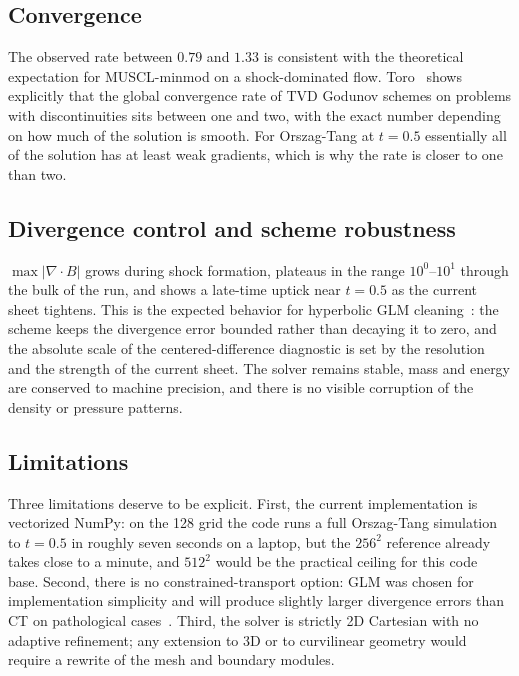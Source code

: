 \documentclass[11pt]{article}
\begin{document}
\subsection{Convergence}

The observed rate between $0.79$ and $1.33$ is consistent with the theoretical expectation for MUSCL-minmod on a shock-dominated flow. Toro~\cite{toro2009} shows explicitly that the global convergence rate of TVD Godunov schemes on problems with discontinuities sits between one and two, with the exact number depending on how much of the solution is smooth.  For Orszag-Tang at $t=0.5$ essentially all of the solution has at least weak gradients, which is why the rate is closer to one than two.

\subsection{Divergence control and scheme robustness}

$\max|\nabla\cdot B|$ grows during shock formation, plateaus in the range $10^{0}$--$10^{1}$ through the bulk of the run, and shows a late-time uptick near $t = 0.5$ as the current sheet tightens.  This is the expected behavior for hyperbolic GLM cleaning~\cite{dedner2002}: the scheme keeps the divergence error bounded rather than decaying it to zero, and the absolute scale of the centered-difference diagnostic is set by the resolution and the strength of the current sheet.  The solver remains stable, mass and energy are conserved to machine precision, and there is no visible corruption of the density or pressure patterns.

\subsection{Limitations}

Three limitations deserve to be explicit.  First, the current implementation is vectorized NumPy: on the 128 grid the code runs a full Orszag-Tang simulation to $t = 0.5$ in roughly seven seconds on a laptop, but the $256^{2}$ reference already takes close to a minute, and $512^{2}$ would be the practical ceiling for this code base.  Second, there is no constrained-transport option: GLM was chosen for implementation simplicity and will produce slightly larger divergence errors than CT on pathological cases~\cite{balsara1999,londrillo2000}.  Third, the solver is strictly 2D Cartesian with no adaptive refinement; any extension to 3D or to curvilinear geometry would require a rewrite of the mesh and boundary modules.
\end{document}
